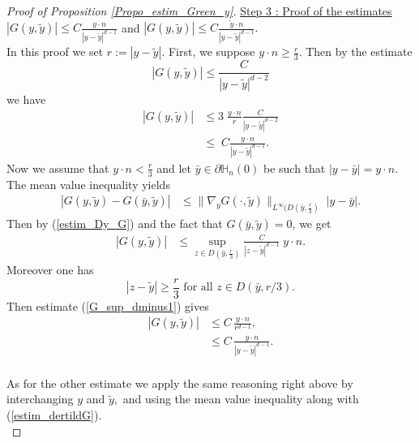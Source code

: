 \documentclass[11pt, reqno]{amsart}
\theoremstyle{definition}
\theoremstyle{remark}
\numberwithin{equation}{section}
\begin{document}
\begin{appendices}
\begin{proof}[Proof of \textup{Proposition \ref{Propo_estim_Green_y}}]
		
		\noindent \underline{Step 3 : Proof of the estimates}  $| G(y,\tilde{y})| \leq C  \frac{y\cdot n}{|y-\tilde{y}|^{d-1}}$ and  $| G(y,\tilde{y})| \leq C  \frac{ \tilde{y} \cdot n}{|y-\tilde{y}|^{d-1}}.$\\
		In this proof we set $r:=|y-\tilde{y}|.$ 
		First, we suppose $y\cdot n \geq \frac{r}{3}$.  Then by the estimate $$| G(y,\tilde{y})| \leq \frac{C}{|y-\tilde{y}|^{d-2}}$$  we have 
		\begin{align*}
			| G(y,\tilde{y})| &\leq 3\;  \frac{y\cdot n}{r}\frac{C}{|y-\tilde{y}|^{d-2}} \\
			&\leq \;C\frac{y\cdot n}{|y-\tilde{y}|^{d-1}} .
		\end{align*}
		Now we assume that $y\cdot n< \frac{r}{3}$  and let  $\bar{y}\in\partial\mathbb{H}_n(0)$ be such that $|y-\bar{y}|=y\cdot n$. 
		The mean value inequality yields 
		\begin{align*}
			| G(y,\tilde{y})- G(\bar{y},\tilde{y})| &\leq \|\nabla_y G(\cdot ,\tilde{y})\|_{L^{\infty}(D(\bar{y}, \frac{r}{3})} \; |y-\bar{y}| .
		\end{align*}
		Then by (\ref{estim_Dy_G}) and the fact that $G(\bar{y},\tilde{y})=0$,    we get 
		\begin{align}\label{G_sup_dminus1}
			| G(y,\tilde{y})  | &\leq  \sup_{z\in D(\bar{y}, \frac{r}{3})} \frac{C }{|z-\tilde{y}|^{d-1}}  \; y\cdot n .
		\end{align}
		Moreover one has  $$|z-\tilde{y}| \geq \frac{r}{3}  \mbox{ for all } z \in{D(\bar{y}, r/3)    }.$$ 
		Then estimate (\ref{G_sup_dminus1}) gives 
		\begin{align*}
			| G(y,\tilde{y})  | &\leq  C\, \frac{y\cdot n }{r^{d-1}},\\       
			&\leq  C\, \frac{y\cdot n }{ |y-\tilde{y}| ^{d-1}}.\\
		\end{align*}	
		
		\noindent As for the other estimate
		we apply the same reasoning right above by
	interchanging  $y$ and  $\tilde{y},$ and using the mean value inequality along with (\ref{estim_dertildG}).\\
		

\end{proof}
\end{appendices}
\end{document}
